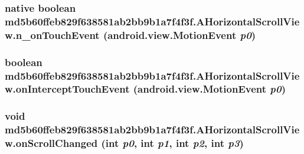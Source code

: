 \hypertarget{classmd5b60ffeb829f638581ab2bb9b1a7f4f3f_1_1_a_horizontal_scroll_view_de5ec2fc49cc6e86e26e3e2ce37f57e5}{
\subsubsection[{n\_\-onTouchEvent}]{\setlength{\rightskip}{0pt plus 5cm}native boolean md5b60ffeb829f638581ab2bb9b1a7f4f3f.AHorizontalScrollView.n\_\-onTouchEvent (android.view.MotionEvent {\em p0})}}
\label{classmd5b60ffeb829f638581ab2bb9b1a7f4f3f_1_1_a_horizontal_scroll_view_de5ec2fc49cc6e86e26e3e2ce37f57e5}


\hypertarget{classmd5b60ffeb829f638581ab2bb9b1a7f4f3f_1_1_a_horizontal_scroll_view_316c95b751f0a5c1adea69370d5325f2}{
\subsubsection[{onInterceptTouchEvent}]{\setlength{\rightskip}{0pt plus 5cm}boolean md5b60ffeb829f638581ab2bb9b1a7f4f3f.AHorizontalScrollView.onInterceptTouchEvent (android.view.MotionEvent {\em p0})}}
\label{classmd5b60ffeb829f638581ab2bb9b1a7f4f3f_1_1_a_horizontal_scroll_view_316c95b751f0a5c1adea69370d5325f2}


\hypertarget{classmd5b60ffeb829f638581ab2bb9b1a7f4f3f_1_1_a_horizontal_scroll_view_308c3a91c514c6d38d0b97ea55e0e988}{
\subsubsection[{onScrollChanged}]{\setlength{\rightskip}{0pt plus 5cm}void md5b60ffeb829f638581ab2bb9b1a7f4f3f.AHorizontalScrollView.onScrollChanged (int {\em p0}, \/  int {\em p1}, \/  int {\em p2}, \/  int {\em p3})}}
\label{classmd5b60ffeb829f638581ab2bb9b1a7f4f3f_1_1_a_horizontal_scroll_view_308c3a91c514c6d38d0b97ea55e0e988}


